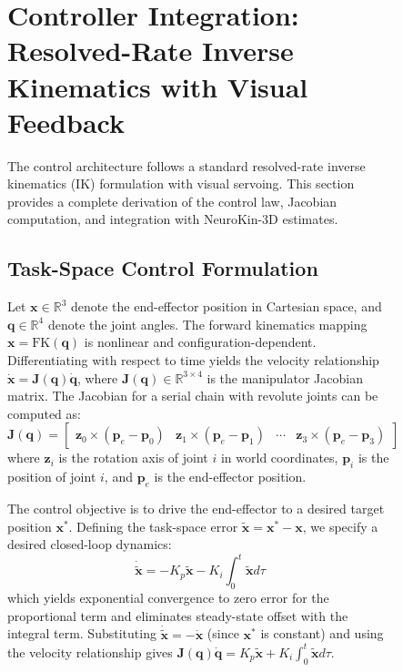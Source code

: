 \documentclass[12pt,a4paper,oneside]{report}
\begin{document}
\begin{figure}[H]
\section{Controller Integration: Resolved-Rate Inverse Kinematics with Visual Feedback}

The control architecture follows a standard resolved-rate inverse kinematics (IK) formulation with visual servoing. This section provides a complete derivation of the control law, Jacobian computation, and integration with NeuroKin-3D estimates.

\subsection{Task-Space Control Formulation}

Let $\mathbf{x} \in \mathbb{R}^3$ denote the end-effector position in Cartesian space, and $\mathbf{q} \in \mathbb{R}^4$ denote the joint angles. The forward kinematics mapping $\mathbf{x} = \text{FK}(\mathbf{q})$ is nonlinear and configuration-dependent. Differentiating with respect to time yields the velocity relationship $\dot{\mathbf{x}} = \mathbf{J}(\mathbf{q}) \dot{\mathbf{q}}$, where $\mathbf{J}(\mathbf{q}) \in \mathbb{R}^{3 \times 4}$ is the manipulator Jacobian matrix. The Jacobian for a serial chain with revolute joints can be computed as:
\begin{equation}
\mathbf{J}(\mathbf{q}) = \begin{bmatrix}
\mathbf{z}_0 \times (\mathbf{p}_e - \mathbf{p}_0) & \mathbf{z}_1 \times (\mathbf{p}_e - \mathbf{p}_1) & \cdots & \mathbf{z}_3 \times (\mathbf{p}_e - \mathbf{p}_3)
\end{bmatrix}
\end{equation}
where $\mathbf{z}_i$ is the rotation axis of joint $i$ in world coordinates, $\mathbf{p}_i$ is the position of joint $i$, and $\mathbf{p}_e$ is the end-effector position.

The control objective is to drive the end-effector to a desired target position $\mathbf{x}^*$. Defining the task-space error $\tilde{\mathbf{x}} = \mathbf{x}^* - \mathbf{x}$, we specify a desired closed-loop dynamics:
\begin{equation}
\dot{\tilde{\mathbf{x}}} = -K_p \tilde{\mathbf{x}} - K_i \int_0^t \tilde{\mathbf{x}} d\tau
\end{equation}
which yields exponential convergence to zero error for the proportional term and eliminates steady-state offset with the integral term. Substituting $\dot{\tilde{\mathbf{x}}} = -\dot{\mathbf{x}}$ (since $\mathbf{x}^*$ is constant) and using the velocity relationship gives $\mathbf{J}(\mathbf{q}) \dot{\mathbf{q}} = K_p \tilde{\mathbf{x}} + K_i \int_0^t \tilde{\mathbf{x}} d\tau$.


\end{figure}
\end{document}
